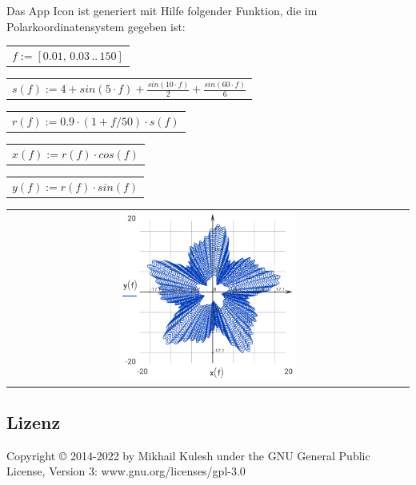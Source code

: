 \documentclass[DIV=calc, paper=a4, fontsize=11pt, twocolumn]{scrartcl}
\begin{document}
Das App Icon ist generiert mit Hilfe
folgender Funktion, die im
Polarkoordinatensystem gegeben ist:
\begin{center}\begin{tabular}{c}
  $f := \left[ 0.01,\, 0.03 \,..\, 150 \right]$
\end{tabular}\end{center}
\begin{center}\begin{tabular}{c}
  $s(f) := 4 + sin \left( 5 \cdot f\right)  + \frac{sin \left( 10 \cdot f\right) }{2} + \frac{sin \left( 60 \cdot f\right) }{6}$
\end{tabular}\end{center}
\begin{center}\begin{tabular}{c}
  $r(f) := 0.9 \cdot \left( 1 + f / 50 \right) \cdot s \left( f\right) $
\end{tabular}\end{center}
\begin{center}\begin{tabular}{c}
  $x(f) := r \left( f\right)  \cdot cos \left( f\right) $
\end{tabular}\end{center}
\begin{center}\begin{tabular}{c}
  $y(f) := r \left( f\right)  \cdot sin \left( f\right) $
\end{tabular}\end{center}
\begin{center}\begin{tabular}{c} \includegraphics[width=0.45\textwidth]{graphics/about_micromath_fig1.png} \end{tabular}\end{center}

\subsection{Lizenz}

Copyright © 2014-2022 by Mikhail Kulesh
under the GNU General Public License,
Version 3:
www.gnu.org/licenses/gpl-3.0
\end{document}
